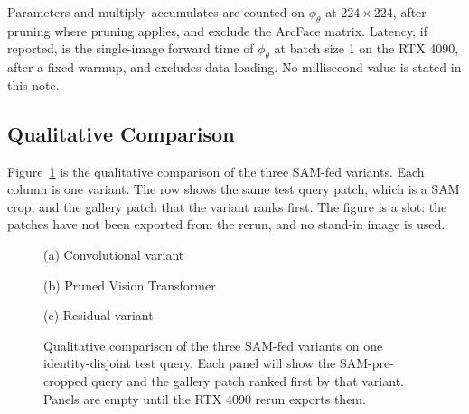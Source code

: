 Parameters and multiply--accumulates are counted on $\phi_{\theta}$ at $224\times 224$, after pruning where pruning applies, and exclude the ArcFace matrix. Latency, if reported, is the single-image forward time of $\phi_{\theta}$ at batch size 1 on the RTX 4090, after a fixed warmup, and excludes data loading. No millisecond value is stated in this note.

\subsection{Qualitative Comparison}
\label{sec:qualitative}

Figure~\ref{fig:qual-sam} is the qualitative comparison of the three SAM-fed variants. Each column is one variant. The row shows the same test query patch, which is a SAM crop, and the gallery patch that the variant ranks first. The figure is a slot: the patches have not been exported from the rerun, and no stand-in image is used.

\begin{figure}[t]
    \centering
    \setlength{\fboxsep}{6pt}
    \begin{minipage}[t]{0.31\linewidth}
        \centering
        \par\vspace{0.4em}
        \small (a) Convolutional variant
    \end{minipage}\hfill
    \begin{minipage}[t]{0.31\linewidth}
        \centering
        \par\vspace{0.4em}
        \small (b) Pruned Vision Transformer
    \end{minipage}\hfill
    \begin{minipage}[t]{0.31\linewidth}
        \centering
        \par\vspace{0.4em}
        \small (c) Residual variant
    \end{minipage}
    \caption{Qualitative comparison of the three SAM-fed variants on one identity-disjoint test query. Each panel will show the SAM-pre-cropped query and the gallery patch ranked first by that variant. Panels are empty until the RTX 4090 rerun exports them.}
    \label{fig:qual-sam}
\end{figure}

